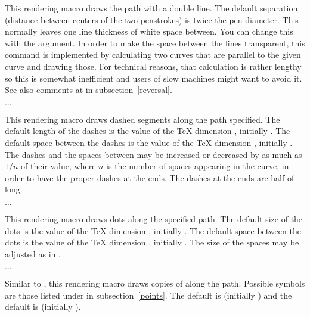 \documentclass[letterpaper]{article}
\begin{document}
This rendering macro draws the path with a double line. The default
separation (distance between centers of the two penstrokes) is twice the
pen diameter. This normally leaves one line thickness of white space
between. You can change this with the  argument. In
order to make the space between the lines transparent, this command is
implemented by calculating two curves that are parallel to the given
curve and drawing those. For technical reasons, that calculation is
rather lengthy so this is somewhat inefficient and users of slow
machines might want to avoid it. See also comments at 
in subsection~\ref{reversal}.

\begin{cd}
$\ldots$%
\end{cd}

This rendering macro draws dashed segments along the path specified.
The default length of the dashes is the value of the \TeX{} dimension
, initially \dim{4pt}. The default space between the dashes
is the value of the \TeX{} dimension , initially
\dim{4pt}. The dashes and the spaces between may be increased or
decreased by as much as $1/n$ of their value, where $n$ is the number of
spaces appearing in the curve, in order to have the proper dashes at the
ends. The dashes at the ends are half of  long.

\begin{cd}
$\ldots$%
\end{cd}

This rendering macro draws dots along the specified path. The default
size of the dots is the value of the \TeX{} dimension ,
initially \dim{0.5pt}. The default space between the dots is the value
of the \TeX{} dimension , initially \dim{3pt}. The size of
the spaces may be adjusted as in .

\begin{cd}
$\ldots$%
\end{cd}

Similar to , this rendering macro draws copies of
 along the path. Possible symbols are those listed under
 in subsection~\ref{points}. The default  is
 (initially \dim{2pt}) and the default  is
 (initially \dim{5pt}).
\end{document}
